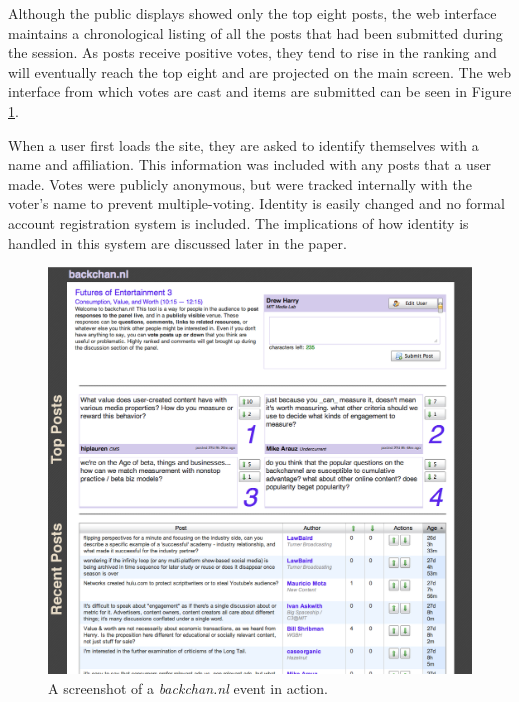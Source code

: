 Although the public displays showed only the top eight posts, the web interface maintains a chronological listing of all the posts that had been submitted during the session. As posts receive positive votes, they tend to rise in the ranking and will eventually reach the top eight and are projected on the main screen. The web interface from which votes are cast and items are submitted can be seen in Figure \ref{fig:backchannl_screenshot}.

When a user first loads the site, they are asked to identify themselves with a name and affiliation. This information was included with any posts that a user made. Votes were publicly anonymous, but were tracked internally with the voter's name to prevent multiple-voting. Identity is easily changed and no formal account registration system is included. The implications of how identity is handled in this system are discussed later in the paper. 

\begin{figure}[t]
	\includegraphics{figures/backchannl/backchannl_screenshot.png}
	\caption{A screenshot of a \emph{backchan.nl} event in action.}
	\label{fig:backchannl_screenshot}
\end{figure}

